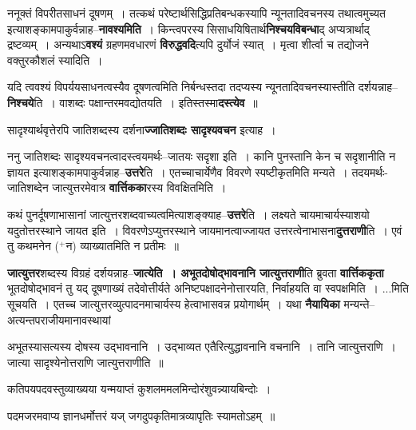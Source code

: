 \documentclass[article,12pt,a4paper]{memoir}
\newcommand{\add}[1]{($^{+}$#1)}
\begin{document}
	  \endgroup
	

	  \pstart ननूक्तं विपरीतसाधनं दूषणम् । तत्कथं परेष्टार्थसिद्धिप्रतिबन्धकस्यापि न्यूनतादिवचनस्य तथात्वमुच्यत इत्याशङ्कामपाकुर्वन्नाह--\textbf{नावश्यमिति} । किन्त्वपरस्य सिसाधयिषितार्थ\textbf{निश्चयविबन्धा}द् अप्यत्रार्थाद् द्रष्टव्यम् । अन्यथाऽ\textbf{वश्यं} ग्रहणमवधारणं \textbf{विरुद्धवदि}त्यपि दुर्योजं स्यात् । मृत्वा शीर्त्वा च तद्योजने वक्तुरकौशलं स्यादिति ।
	\pend
      

	  \pstart यदि त्ववश्यं विपर्ययसाधनत्वस्यैव दूषणत्वमिति निर्बन्धस्तदा तदप्यस्य न्यूनतादिवचनस्यास्तीति दर्शयन्नाह--\textbf{निश्चये}ति । वाशब्दः पक्षान्तरमवद्योतयति । इतिस्तस्मा\textbf{दस्त्येव} ॥
	\pend
      

	  \pstart सादृश्यार्थवृत्तेरपि जातिशब्दस्य दर्शना\textbf{ज्जातिशब्दः सादृश्यवचन} इत्याह ।
	\pend
      

	  \pstart ननु जातिशब्दः सादृश्यवचनत्वादस्त्वयमर्थः--जातयः सदृशा इति । कानि पुनस्तानि केन च सदृशानीति न ज्ञायत इत्याशङ्कामपाकुर्वन्नाह--\textbf{उत्तरे}ति । एतच्चाचार्येणैव विवरणे स्पष्टीकृतमिति मन्यते । तदयमर्थः-जातिशब्देन जात्युत्तरमेवात्र \textbf{वार्त्तिकका}रस्य विवक्षितमिति ।
	\pend
      

	  \pstart कथं पुनर्दूषणाभासानां जात्युत्तरशब्दवाच्यत्वमित्याशङ्क्याह--\textbf{उत्तरे}ति । लक्ष्यते चायमाचार्यस्याशयो यदुतोत्तरस्थाने जायत इति । विवरणेऽप्युत्तरस्थाने जायमानत्वाज्जायत उत्तरत्वेनाभासना\textbf{दुत्तराणी}ति । एवं तु कथमनेन \add{न} व्याख्यातमिति न प्रतीमः ॥
	\pend
      

	  \pstart \textbf{जात्युत्तर}शब्दस्य विग्रहं दर्शयन्नाह--\textbf{जात्येति । अभूतदोषोद्भावनानि जात्युत्तराणी}ति ब्रुवता \textbf{वार्त्तिककृता} भूतदोषोद्भावनं तु यद् दूषणाख्यं तदेवोत्तीर्यते अनिष्टपक्षादनेनोत्तारयति, निर्वाहयति वा स्वपक्षमिति । \leavevmode{}...मिति सूचयति । एतच्च जात्युत्तरव्युत्पादनमाचार्यस्य हेत्वाभासवन्न प्रयोगार्थम् । यथा \textbf{नैयायिका} मन्यन्ते--अत्यन्तपराजीयमानावस्थायां     \leavevmode{} 
	  
	अभूतस्यासत्यस्य दोषस्य उद्भावनानि । उद्भाव्यत एतैरित्युद्धावनानि वचनानि । तानि जात्युत्तराणि । जात्या सादृश्येनोत्तराणि जात्युत्तराणीति ॥  
	  
	कतिपयपदवस्तुव्याख्यया यन्मयाप्तं कुशलममलमिन्दोरंशुवन्न्यायबिन्दोः ।  
	  
	पदमजरमवाप्य ज्ञानधर्मोत्तरं यज् जगदुपकृतिमात्रव्यापृतिः स्यामतोऽहम् ॥  
	  
\end{document}
